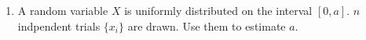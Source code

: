 \documentclass[a4paper,12pt]{article}
\begin{document}
\begin{enumerate}
   \item A random variable $X$ is uniformly distributed on the interval $[0,a]$. $n$ indpendent trials $\{x_i\}$ are drawn. Use them to estimate $a$.
 \end{enumerate}
\end{document}
